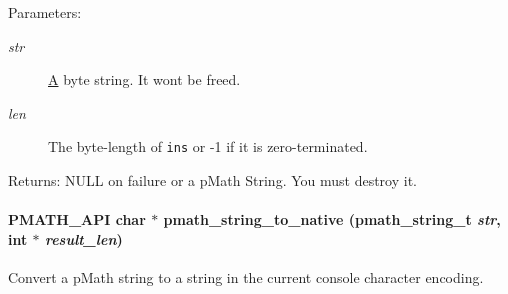 \begin{Desc}
\item[Parameters:]
\begin{description}
\item[{\em str}]\hyperlink{class_a}{A} byte string. It wont be freed. \item[{\em len}]The byte-length of {\tt ins} or -1 if it is zero-terminated. \end{description}
\end{Desc}
\begin{Desc}
\item[Returns:]NULL on failure or a pMath String. You must destroy it. \end{Desc}
\hypertarget{group__strings_g7ccade7efa65dc24f7cd573f15fc07e9}{
\paragraph[{pmath\_\-string\_\-to\_\-native}]{\setlength{\rightskip}{0pt plus 5cm}PMATH\_\-API char $\ast$ pmath\_\-string\_\-to\_\-native ({\bf pmath\_\-string\_\-t} {\em str}, \/  int $\ast$ {\em result\_\-len})}\hfill}
\label{group__strings_g7ccade7efa65dc24f7cd573f15fc07e9}


Convert a pMath string to a string in the current console character encoding. 

